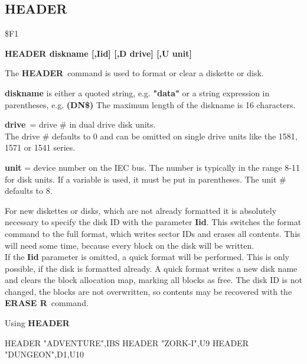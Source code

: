 \subsection{HEADER}
\begin{description}[leftmargin=3cm,style=nextline]
\item [Token:] \$F1
\item [Format:] {\bf HEADER diskname [,Iid] [,D drive] [,U unit] }
\item [Usage:]
   The {\bf HEADER} command is used to format or clear a diskette
   or disk.

   {\bf diskname} is either a quoted string, e.g. {\bf "data"} or
   a string expression in parentheses, e.g. {\bf (DN\$)}
   The maximum length of the diskname is 16 characters.

   {\bf drive} = drive \# in dual drive disk units. \\
   The drive \# defaults to 0 and can be omitted on single drive units
   like the 1581, 1571 or 1541 series.

   {\bf unit} = device number on the IEC bus.
   The number is typically in the range 8-11 for disk units.
   If a variable is used, it must be put in parentheses.
   The unit \# defaults to 8.

\item [Remarks:]
   For new diskettes or disks, which are not already formatted
   it is absolutely necessary to specify the disk ID with the
   parameter {\bf Iid}. This switches the format command to the
   full format, which writes sector IDs and erases all contents.
   This will need some time, because every block on the disk will
   be written. \\
   If the {\bf Iid} parameter is omitted, a quick format will
   be performed. This is only possible, if the disk is formatted
   already. A quick format writes a new disk name and clears the
   block allocation map, marking all blocks as free.
   The disk ID is not changed, the blocks are not overwritten,
   so contents may be recovered with the {\bf ERASE R} command.

\item [Example:] Using {\bf HEADER}
\begin{screenoutput}
  HEADER "ADVENTURE",IBS
  HEADER "ZORK-I",U9
  HEADER "DUNGEON",D1,U10
\end{screenoutput}
\end{description}


\newpage
